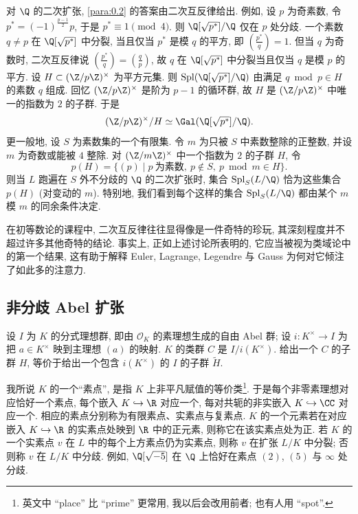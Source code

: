 对 $\Q$ 的二次扩张, \ref{para:0.2} 的答案由二次互反律给出. 例如, 设 $p$ 为奇素数, 令 $p^{*} = (-1)^{\frac{p-1}{2}}p$, 于是 $p^{*} \equiv 1 \pmod{4}$. 则 $\Q[\sqrt{p^{*}}]/\Q$ 仅在 $p$ 处分歧. 一个素数 $q \neq p$ 在 $\Q[\sqrt{p^{*}}]$ 中分裂, 当且仅当 $p^{*}$ 是模 $q$ 的平方, 即 $\left(\frac{p^{*}}{q}\right) = 1$. 但当 $q$ 为奇数时, 二次互反律说 $\left(\frac{p^{*}}{q}\right) = \left(\frac{q}{p}\right)$, 故 $q$ 在 $\Q[\sqrt{p^{*}}]$ 中分裂当且仅当 $q$ 是模 $p$ 的平方. 设 $H \subset (\Z/p\Z)^{\times}$ 为平方元集. 则 $\Spl(\Q[\sqrt{p^{*}}]/\Q)$ 由满足 $q \bmod p \in H$ 的素数 $q$ 组成. 回忆 $(\Z/p\Z)^{\times}$ 是阶为 $p-1$ 的循环群, 故 $H$ 是 $(\Z/p\Z)^{\times}$ 中唯一的指数为 $2$ 的子群. 于是
\[
(\Z/p\Z)^{\times}/H \simeq \Gal(\Q[\sqrt{p^{*}}]/\Q).
\]
更一般地, 设 $S$ 为素数集的一个有限集. 令 $m$ 为只被 $S$ 中素数整除的正整数, 并设 $m$ 为奇数或能被 $4$ 整除. 对 $(\Z/m\Z)^{\times}$ 中一个指数为 $2$ 的子群 $H$, 令
\[
p(H) = \{(p) \mid p\ \text{为素数},\ p \notin S,\ p \bmod m \in H\}.
\]
则当 $L$ 跑遍在 $S$ 外不分歧的 $\Q$ 的二次扩张时, 集合 $\Spl_{S}(L/\Q)$ 恰为这些集合 $p(H)$ (对变动的 $m$). 特别地, 我们看到每个这样的集合 $\Spl_{S}(L/\Q)$ 都由某个 $m$ 模 $m$ 的同余条件决定.

\begin{NOTES}
在初等数论的课程中, 二次互反律往往显得像是一件奇特的珍玩, 其深刻程度并不超过许多其他奇特的结论. 事实上, 正如上述讨论所表明的, 它应当被视为类域论中的第一个结果, 这有助于解释 Euler, Lagrange, Legendre 与 Gauss 为何对它倾注了如此多的注意力.
\end{NOTES}

\subsection*{非分歧 Abel 扩张}

设 $I$ 为 $K$ 的分式理想群, 即由 $\mathcal{O}_{K}$ 的素理想生成的自由 Abel 群; 设 $i : K^{\times} \to I$ 为把 $a \in K^{\times}$ 映到主理想 $(a)$ 的映射. $K$ 的类群 $C$ 是 $I/i(K^{\times})$. 给出一个 $C$ 的子群 $H$, 等价于给出一个包含 $i(K^{\times})$ 的 $I$ 的子群 $\tilde{H}$.

我所说 $K$ 的一个``素点'', 是指 $K$ 上非平凡赋值的等价类\footnote{英文中 “place” 比 “prime” 更常用, 我以后会改用前者; 也有人用 “spot”. }. 于是每个非零素理想对应恰好一个素点, 每个嵌入 $K \hookrightarrow \R$ 对应一个, 每对共轭的非实嵌入 $K \hookrightarrow \CC$ 对应一个. 相应的素点分别称为有限素点、实素点与复素点. $K$ 的一个元素若在对应嵌入 $K \hookrightarrow \R$ 的实素点处映到 $\R$ 中的正元素, 则称它在该实素点处为正. 若 $K$ 的一个实素点 $v$ 在 $L$ 中的每个上方素点仍为实素点, 则称 $v$ 在扩张 $L/K$ 中分裂; 否则称 $v$ 在 $L/K$ 中分歧. 例如, $\Q[\sqrt{-5}]$ 在 $\Q$ 上恰好在素点 $(2)$, $(5)$ 与 $\infty$ 处分歧.

